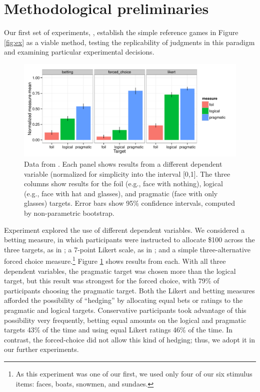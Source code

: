 \section{Methodological preliminaries}
\label{sec:prelims}

Our first set of experiments, , establish the simple reference games in Figure \ref{fig:ex} as a viable method, testing the replicability of judgments in this paradigm and examining particular experimental decisions. 

\begin{figure}[t]
  \centering
  \includegraphics[width=6in]{../plots/1-prelims-dv.pdf}
  \caption{\label{fig:prelims-dv} Data from . Each panel shows results from a different dependent variable (normalized for simplicity into the interval [0,1]. The three columns show results for the foil (e.g., face with nothing), logical (e.g., face with hat and glasses), and pragmatic (face with only glasses) targets. Error bars show 95\% confidence intervals, computed by non-parametric bootstrap.}
\end{figure}

Experiment  explored the use of different dependent variables. We considered a betting measure, in which participants were instructed to allocate \$100 across the three targets, as in ; a 7-point Likert scale, as in ; and a simple three-alternative forced choice measure.\footnote{As this experiment was one of our first, we used only four of our six stimulus items: faces, boats, snowmen, and sundaes.} Figure \ref{fig:prelims-dv} shows results from each. With all three dependent variables, the pragmatic target was chosen more than the logical target, but this result was strongest for the forced choice, with 79\% of participants choosing the pragmatic target. Both the Likert and betting measures afforded the possibility of ``hedging'' by allocating equal bets or ratings to the pragmatic and logical targets. Conservative participants took advantage of this possibility very frequently, betting equal amounts on the logical and pragmatic targets 43\% of the time and using equal Likert ratings 46\% of the time. In contrast, the forced-choice did not allow this kind of hedging; thus, we adopt it in our further experiments.  

